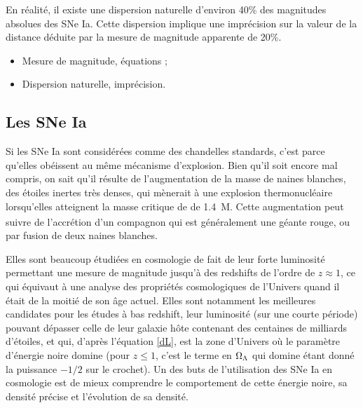 \documentclass[a4paper, 12pt, svgnames]{article}
\begin{document}
En réalité, il existe une dispersion naturelle d'environ 40\% des magnitudes
absolues des SNe Ia. Cette dispersion implique une imprécision sur la valeur de
la distance déduite par la mesure de magnitude apparente de 20\%.

%

\begin{itemize}
    \item Mesure de magnitude, équations ;
    \item Dispersion naturelle, imprécision.
\end{itemize}

\subsection{Les SNe Ia}

Si les SNe Ia sont considérées comme des chandelles standards, c'est parce
qu'elles obéissent au même mécanisme d'explosion. Bien qu'il soit encore mal
compris, on sait qu'il résulte de l'augmentation de la masse de naines
blanches, des étoiles inertes très denses, qui mènerait à une explosion
thermonucléaire lorsqu'elles atteignent la masse critique de 
de \SI{1.4}{M_\odot}. Cette augmentation peut suivre de l'accrétion d'un
compagnon qui est généralement une géante rouge, ou par fusion de deux naines
blanches.

Elles sont beaucoup étudiées en cosmologie de fait de leur forte luminosité
permettant une mesure de magnitude jusqu'à des redshifts de l'ordre de $z
\approx 1$, ce qui équivaut à une analyse des propriétés cosmologiques de
l'Univers quand il était de la moitié de son âge actuel. Elles sont notamment
les meilleures candidates pour les études à bas redshift, leur luminosité (sur
une courte période) pouvant dépasser celle de leur galaxie hôte contenant des
centaines de milliards d'étoiles,  et qui, d'après l'équation \ref{dL}, est la
zone d'Univers où le paramètre d'énergie noire domine (pour $z \leq 1$, c'est le
terme en $\Omega_\Lambda$ qui domine étant donné la puissance $-1/2$ sur le crochet). Un
des buts de l'utilisation des SNe Ia en cosmologie est de mieux comprendre le
comportement de cette énergie noire, sa densité précise et l'évolution de sa
densité.
\end{document}
